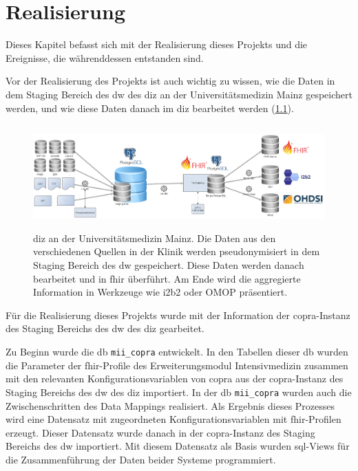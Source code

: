 \chapter{Realisierung} \label{ch:results}

Dieses Kapitel befasst sich mit der Realisierung dieses Projekts und die Ereignisse, die währenddessen entstanden sind.


Vor der Realisierung des Projekts ist auch wichtig zu wissen, wie die Daten in dem Staging Bereich des \ac{dw} des \ac{diz} an der Universitätsmedizin Mainz gespeichert werden, und wie diese Daten danach im \ac{diz} bearbeitet werden (\ref{fig:dizummz}).

\begin{figure}[ht]
	\centering
	\includegraphics[height=4cm]{figures/diz_ummz}
	\caption[\acs{diz} an der Universitätsmedizin Mainz] {\acs{diz} an der Universitätsmedizin Mainz. Die Daten aus den verschiedenen Quellen in der Klinik werden pseudonymisiert in dem Staging Bereich des \ac{dw} gespeichert. Diese Daten werden danach bearbeitet und in \ac{fhir} überführt. Am Ende wird die aggregierte Information in Werkzeuge wie i2b2 oder OMOP präsentiert.}
	\label{fig:dizummz}
\end{figure}

Für die Realisierung dieses Projekts wurde mit der Information der \ac{copra}-Instanz des Staging Bereichs des \ac{dw} des \ac{diz} gearbeitet.

 Zu Beginn wurde die \ac{db} \texttt{mii\_copra} entwickelt. In den Tabellen dieser \ac{db} wurden die Parameter der \ac{fhir}-Profile des Erweiterungsmodul \glqq Intensivmedizin\grqq{} zusammen mit den relevanten Konfigurationsvariablen von \ac{copra} aus der \ac{copra}-Instanz des Staging Bereichs des \ac{dw} des \ac{diz} importiert. In der \ac{db} \texttt{mii\_copra} wurden auch die Zwischenschritten des Data Mappings realisiert. Als Ergebnis dieses Prozesses wird eine Datensatz mit zugeordneten Konfigurationsvariablen mit \ac{fhir}-Profilen erzeugt. Dieser Datensatz wurde danach in der \ac{copra}-Instanz des Staging Bereichs des \ac{dw} importiert. Mit diesem Datensatz als Basis wurden \ac{sql}-Views für die Zusammenführung der Daten beider Systeme programmiert.

